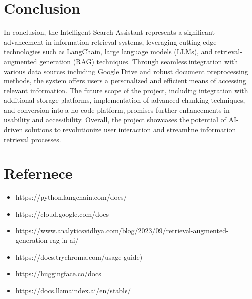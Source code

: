 \documentclass[12pt,a4paper,oneside]{report}
\begin{document}
\chapter{Conclusion}
\hspace{20pt}In conclusion, the Intelligent Search Assistant represents a significant advancement in information retrieval systems, leveraging cutting-edge technologies such as LangChain, large language models (LLMs), and retrieval-augmented generation (RAG) techniques. Through seamless integration with various data sources including Google Drive and robust document preprocessing methods, the system offers users a personalized and efficient means of accessing relevant information. The future scope of the project, including integration with additional storage platforms, implementation of advanced chunking techniques, and conversion into a no-code platform, promises further enhancements in usability and accessibility. Overall, the project showcases the potential of AI-driven solutions to revolutionize user interaction and streamline information retrieval processes.

\newpage
\chapter{Refernece}
\begin{itemize}
\item{https://python.langchain.com/docs/}
\item{https://cloud.google.com/docs}
\item{https://www.analyticsvidhya.com/blog/2023/09/retrieval-augmented-generation-rag-in-ai/}
\item{https://docs.trychroma.com/usage-guide)}
\item{https://huggingface.co/docs}
\item{https://docs.llamaindex.ai/en/stable/}
\end{itemize}
\end{document}
